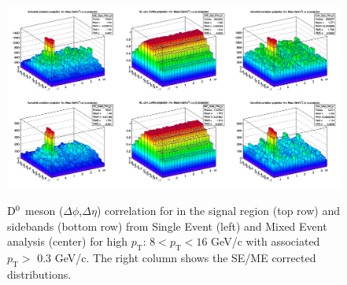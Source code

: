 \begin{figure}
\centering
{\includegraphics[width=1\linewidth]{figures/Dzero/CorrSEandME_Dzero_Canvas_PtIntBins9to11_pool7_thr0dot3to99dot0.png}}
 \caption{${\rm D^0}$ meson ($\Delta\phi$,$ \Delta\eta$) correlation for in the signal region (top row) and sidebands (bottom row) from  Single Event (left) and Mixed Event analysis (center) for high $p_\mathrm{T}$: $8 < p_\mathrm{T}<16$ GeV/c with associated $p_\mathrm{T} >$ 0.3 GeV/c. The right column shows the SE/ME corrected distributions.}
\label{fig:DzeroME}
\end{figure}

